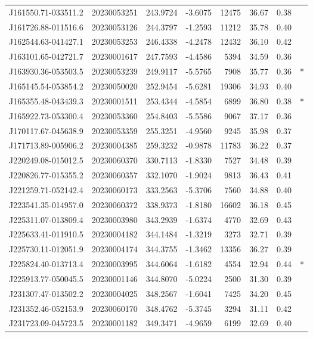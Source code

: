 \documentclass{article}
\begin{document}
\begin {longtable}{|l|l|r|r|r|r|r|l|}
 J161550.71-033511.2&  20230053251&  243.9724&   -3.6075& 12475& 36.67& 0.38&\\
 J161726.88-011516.6&  20230053126&  244.3797&   -1.2593& 11212& 35.78& 0.40&\\
 J162544.63-041427.1&  20230053253&  246.4338&   -4.2478& 12432& 36.10& 0.42&\\
 J163101.65-042721.7&  20230001617&  247.7593&   -4.4586&  5394& 34.59& 0.36&\\
 J163930.36-053503.5&  20230053239&  249.9117&   -5.5765&  7908& 35.77& 0.36&*\\%
 J165145.54-053854.2&  20230050020&  252.9454&   -5.6281& 19306& 34.93& 0.40&\\
 J165355.48-043439.3&  20230001511&  253.4344&   -4.5854&  6899& 36.80& 0.38&*\\%
 J165922.73-053300.4&  20230053360&  254.8403&   -5.5586&  9067& 37.17& 0.36&\\
 J170117.67-045638.9&  20230053359&  255.3251&   -4.9560&  9245& 35.98& 0.37&\\
 J171713.89-005906.2&  20230004385&  259.3232&   -0.9878& 11783& 36.22& 0.37&\\
 J220249.08-015012.5&  20230060370&  330.7113&   -1.8330&  7527& 34.48& 0.39&\\
 J220826.77-015355.2&  20230060357&  332.1070&   -1.9024&  9813& 36.43& 0.41&\\
 J221259.71-052142.4&  20230060173&  333.2563&   -5.3706&  7560& 34.88& 0.40&\\
 J223541.35-014957.0&  20230060372&  338.9373&   -1.8180& 16602& 36.18& 0.45&\\
 J225311.07-013809.4&  20230003980&  343.2939&   -1.6374&  4770& 32.69& 0.43&\\
 J225633.41-011910.5&  20230004182&  344.1484&   -1.3219&  3273& 32.71& 0.39&\\
 J225730.11-012051.9&  20230004174&  344.3755&   -1.3462& 13356& 36.27& 0.39&\\
 J225824.40-013713.4&  20230003995&  344.6064&   -1.6182&  4554& 32.94& 0.44&*\\%
 J225913.77-050045.5&  20230001146&  344.8070&   -5.0224&  2500& 31.30& 0.39&\\
 J231307.47-013502.2&  20230004025&  348.2567&   -1.6041&  7425& 34.20& 0.45&\\
 J231352.46-052153.9&  20230060170&  348.4762&   -5.3745&  3294& 31.11& 0.42&\\
 J231723.09-045723.5&  20230001182&  349.3471&   -4.9659&  6199& 32.69& 0.40&\\

\end{longtable}
\end{document}
